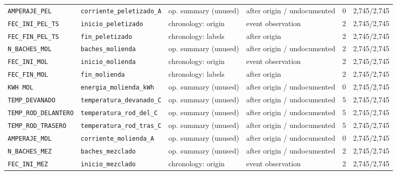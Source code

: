 \begin{table}[!htbp]
\begin{tabularx}{\linewidth}{@{}>{\raggedright\arraybackslash}p{.16\linewidth}>{\raggedright\arraybackslash}p{.23\linewidth}>{\raggedright\arraybackslash}p{.15\linewidth}>{\raggedright\arraybackslash}Xrr@{}}
\texttt{AMPERAJE\_\allowbreak{}PEL} & \texttt{corriente\_\allowbreak{}peletizado\_\allowbreak{}A} & op. summary (unused) & after origin / undocumented & 0 & 2,745/2,745 \\
\texttt{FEC\_\allowbreak{}INI\_\allowbreak{}PEL\_\allowbreak{}TS} & \texttt{inicio\_\allowbreak{}peletizado} & chronology: origin & event observation & 2 & 2,745/2,745 \\
\texttt{FEC\_\allowbreak{}FIN\_\allowbreak{}PEL\_\allowbreak{}TS} & \texttt{fin\_\allowbreak{}peletizado} & chronology: labels & after origin & 2 & 2,745/2,745 \\
\texttt{N\_\allowbreak{}BACHES\_\allowbreak{}MOL} & \texttt{baches\_\allowbreak{}molienda} & op. summary (unused) & after origin / undocumented & 2 & 2,745/2,745 \\
\texttt{FEC\_\allowbreak{}INI\_\allowbreak{}MOL} & \texttt{inicio\_\allowbreak{}molienda} & chronology: origin & event observation & 2 & 2,745/2,745 \\
\texttt{FEC\_\allowbreak{}FIN\_\allowbreak{}MOL} & \texttt{fin\_\allowbreak{}molienda} & chronology: labels & after origin & 2 & 2,745/2,745 \\
\texttt{KWH MOL} & \texttt{energia\_\allowbreak{}molienda\_\allowbreak{}kWh} & op. summary (unused) & after origin / undocumented & 0 & 2,745/2,745 \\
\texttt{TEMP\_\allowbreak{}DEVANADO} & \texttt{temperatura\_\allowbreak{}devanado\_\allowbreak{}C} & op. summary (unused) & after origin / undocumented & 5 & 2,745/2,745 \\
\texttt{TEMP\_\allowbreak{}ROD\_\allowbreak{}DELANTERO} & \texttt{temperatura\_\allowbreak{}rod\_\allowbreak{}del\_\allowbreak{}C} & op. summary (unused) & after origin / undocumented & 5 & 2,745/2,745 \\
\texttt{TEMP\_\allowbreak{}ROD\_\allowbreak{}TRASERO} & \texttt{temperatura\_\allowbreak{}rod\_\allowbreak{}tras\_\allowbreak{}C} & op. summary (unused) & after origin / undocumented & 5 & 2,745/2,745 \\
\texttt{AMPERAJE\_\allowbreak{}MOL} & \texttt{corriente\_\allowbreak{}molienda\_\allowbreak{}A} & op. summary (unused) & after origin / undocumented & 0 & 2,745/2,745 \\
\texttt{N\_\allowbreak{}BACHES\_\allowbreak{}MEZ} & \texttt{baches\_\allowbreak{}mezclado} & op. summary (unused) & after origin / undocumented & 2 & 2,745/2,745 \\
\texttt{FEC\_\allowbreak{}INI\_\allowbreak{}MEZ} & \texttt{inicio\_\allowbreak{}mezclado} & chronology: origin & event observation & 2 & 2,745/2,745 \\

\end{tabularx}
\end{table}
